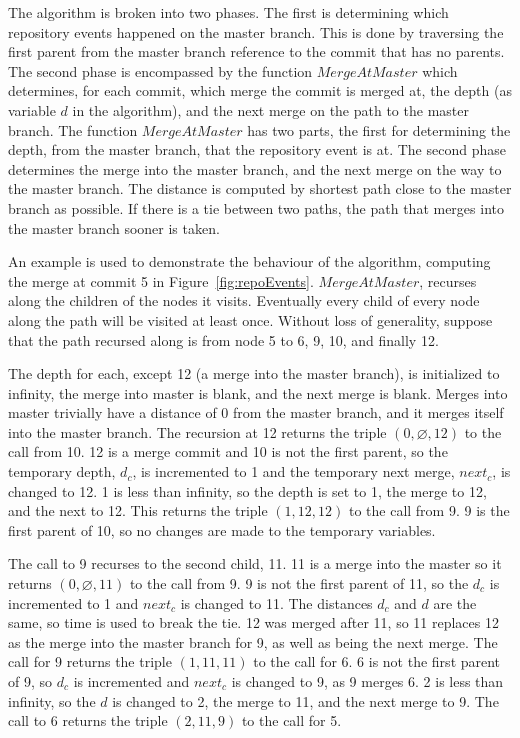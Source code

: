 The algorithm is broken into two phases.
The first is determining which repository events happened on the master
branch.
This is done by traversing the first parent from the master branch
reference to the commit that has no parents.
The second phase is encompassed by the function
$MergeAtMaster$ which determines, for each commit, which merge the
commit is merged at, the depth (as variable $d$ in the algorithm), and
the next merge on the path to the master branch. The function
$MergeAtMaster$ has two parts, the first for determining the depth, from
the master branch, that the repository event is at. The second phase
determines the merge into the master branch, and the next merge on the
way to the master branch.
The distance is computed by shortest path close to the master branch as
possible.
If there is a tie between two paths, the path that merges into the
master branch sooner is taken.

An example is used to demonstrate the behaviour of the algorithm,
computing the merge at commit 5 in Figure~\ref{fig:repoEvents}.
$MergeAtMaster$, recurses along the children of the nodes it visits.
Eventually every child of every node along the path will be visited at
least once. Without loss of generality, suppose that the path recursed
along is from node 5 to 6, 9, 10, and finally 12.

The depth for each, except 12 (a merge into the master branch), is
initialized to infinity, the merge into master is blank, and the next
merge is blank. Merges into master trivially have a distance of 0 from
the master branch, and it merges itself into the master branch. The
recursion at 12 returns the triple $(0, \varnothing, 12)$ to the call
from 10. 12 is a merge commit and 10 is not the first parent, so the
temporary depth, $d_c$, is incremented to 1 and the temporary next
merge, $next_c$, is changed to 12. 1 is less than infinity, so the depth
is set to 1, the merge to 12, and the next to 12. This returns the
triple $(1, 12, 12)$ to the call from 9. 9 is the first parent of 10, so
no changes are made to the temporary variables.

The call to 9 recurses to the second child, 11. 11 is a merge into the
master so it returns $(0, \varnothing, 11)$ to the call from 9. 9 is not
the first parent of 11, so the $d_c$ is incremented to 1 and $next_c$ is
changed to 11. The distances $d_c$ and $d$ are the same, so time is used
to break the tie. 12 was merged after 11, so 11 replaces 12 as the
merge into the master branch for 9, as well as being the next merge. The
call for 9 returns the triple $(1, 11, 11)$ to the call for 6. 6 is not
the first parent of 9, so $d_c$ is incremented and $next_c$ is changed
to 9, as 9 merges 6. 2 is less than infinity, so the $d$ is changed to
2, the merge to 11, and the next merge to 9. The call to 6 returns the
triple $(2, 11, 9)$ to the call for 5.


